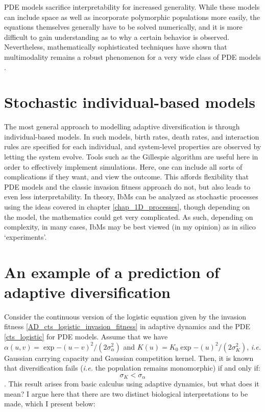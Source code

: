 PDE models sacrifice interpretability for increased generality. While these models can include space as well as incorporate polymorphic populations more easily, the equations themselves generally have to be solved numerically, and it is more difficult to gain understanding as to why a certain behavior is observed. Nevertheless, mathematically sophisticated techniques have shown that multimodality remains a robust phenomenon for a very wide class of PDE models \citep{elmhirst_pod_2008,doebeli_adaptive_2011}.

\section{Stochastic individual-based models}

The most general approach to modelling adaptive diversification is through individual-based models. In such models, birth rates, death rates, and interaction rules are specified for each individual, and system-level properties are observed by letting the system evolve. Tools such as the Gillespie algorithm are useful here in order to effectively implement simulations. Here, one can include all sorts of complications if they want, and view the outcome. This affords flexibility that PDE models and the classic invasion fitness approach do not, but also leads to even less interpretability. In theory, IbMs can be analyzed as stochastic processes using the ideas covered in chapter \ref{chap_1D_processes}, though depending on the model, the mathematics could get very complicated. As such, depending on complexity, in many cases, IbMs may be best viewed (in my opinion) as in silico `experiments'.

\section{An example of a prediction of adaptive diversification}

Consider the continuous version of the logistic equation given by the invasion fitness \eqref{AD_cts_logistic_invasion_fitness} in adaptive dynamics and the PDE \eqref{cts_logistic} for PDE models. Assume that we have $\alpha(u,v) = \exp{-(u-v)^2/(2\sigma^{2}_{\alpha})}$ and $K(u) = K_{0}\exp{-(u)^2/(2\sigma^{2}_{K})}$, \emph{i.e.} Gaussian carrying capacity and Gaussian competition kernel. Then, it is known that diversification fails (\emph{i.e.} the population remains monomorphic) if and only if:
\begin{equation}\label{AD_monomorphic_condn}
	\sigma_K<\sigma_{\alpha}
\end{equation}.
This result arises from basic calculus using adaptive dynamics, but what does it mean? I argue here that there are two distinct biological interpretations to be made, which I present below:

